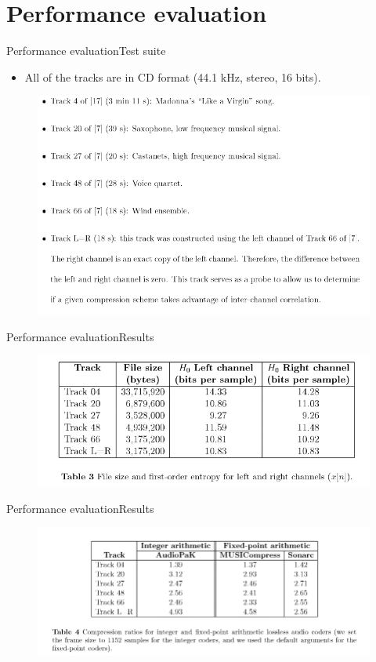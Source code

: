 \documentclass{beamer}
\begin{document}
\section{Performance evaluation}
\begin{frame}{Performance evaluation}{Test suite}
	\begin{itemize}
		\item{
			All of the tracks are in CD format (44.1 kHz, stereo, 16 bits).
		}
	\end{itemize}
	\begin{figure}
		\includegraphics[scale=0.35]{tracks.png}
	\end{figure}  
\end{frame}
\begin{frame}{Performance evaluation}{Results}
	\begin{figure}
		\includegraphics[scale=0.45]{results.png}
	\end{figure} 
\end{frame}
\begin{frame}{Performance evaluation}{Results}
	\begin{figure}
		\includegraphics[scale=0.35]{results2.png}
	\end{figure} 
\end{frame}
\end{document}
